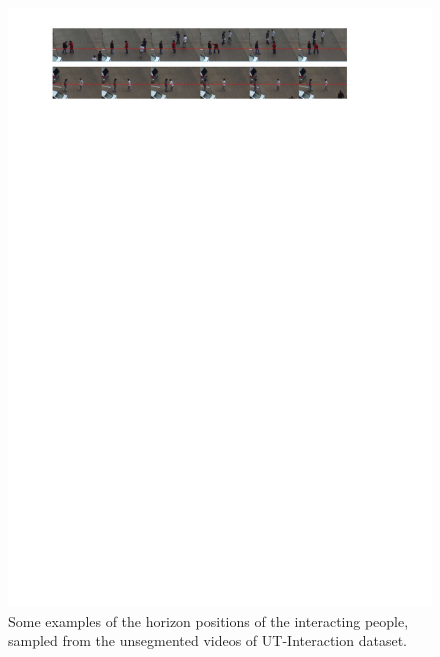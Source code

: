 \begin{figure}
	\includegraphics[trim=2cm 24.5cm 0cm 1cm]{fig01/interacting_people.pdf}
	\caption{Some examples of the horizon positions of the interacting people, sampled from the unsegmented videos of UT-Interaction dataset.}
	\label{fig:interacting_people}
\end{figure}

